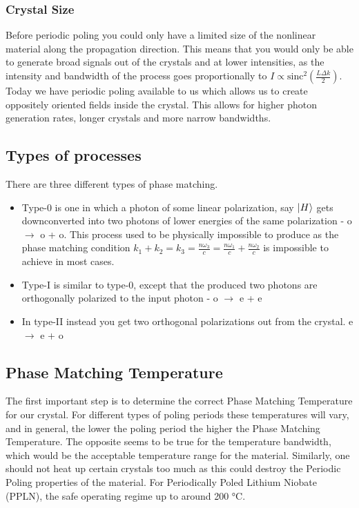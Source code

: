 \documentclass{article}
\theoremstyle{mytheoremstyle}
\theoremstyle{mytheoremstyle}
\theoremstyle{myproblemstyle}
\begin{document}
\subsubsection{Crystal Size}
Before periodic poling you could only have a limited size of the nonlinear material along the propagation direction.
This means that you would only be able to generate broad signals out of the crystals and at lower intensities, as the 
intensity and bandwidth of the process goes proportionally to $I \propto \text{sinc}^2\left(\frac{L \Delta k}{2}\right)$.
Today we have periodic poling available to us which allows us to create oppositely oriented fields inside the
crystal. This allows for higher photon generation rates, longer crystals and more narrow bandwidths.

\subsection{Types of processes}
There are three different types of phase matching.
\begin{itemize}
	\item Type-0 is one in which a photon of some linear polarization, say $\ket{H}$ gets downconverted
into two photons of lower energies of the same polarization - o $\rightarrow$ o + o. This process used to be physically impossible to produce 
as the phase matching condition $k_1 + k_2 = k_3 = \frac{n \omega_3}{c} = \frac{n \omega_1}{c} + \frac{n \omega_2}{c}$ is impossible to achieve
in most cases.
	\item Type-I is similar to type-0, except that the produced two photons are orthogonally polarized to the input photon - o $\rightarrow$ e + e
	\item In type-II instead you get two orthogonal polarizations out from the crystal. e $\rightarrow$ e + o
\end{itemize}

\subsection{Phase Matching Temperature}
The first important step is to determine the correct Phase Matching Temperature for our crystal. For different types of poling
periods these temperatures will vary, and in general, the lower the poling period the higher the Phase Matching Temperature.
The opposite seems to be true for the temperature bandwidth, which would be the acceptable temperature range for the material.
Similarly, one should not heat up certain crystals too much as this could destroy the Periodic Poling properties of the material.
For Periodically Poled Lithium Niobate (PPLN), the safe operating regime up to around 200 °C.
\end{document}
